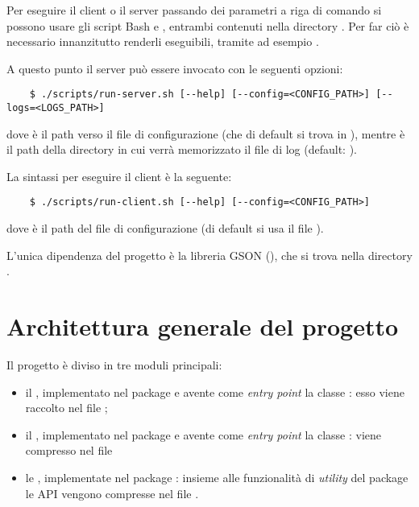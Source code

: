 \documentclass[
    oneside,
    10pt,
    language=italian,
    a4paper,
    article
]{notes}
\begin{document}
Per eseguire il client o il server passando dei parametri a riga di comando si
possono usare gli script Bash  e ,
entrambi contenuti nella directory . Per far ciò è necessario
innanzitutto renderli eseguibili, tramite ad esempio 
.

A questo punto il server può essere invocato con le seguenti opzioni:

\begin{verbatim}
    $ ./scripts/run-server.sh [--help] [--config=<CONFIG_PATH>] [--logs=<LOGS_PATH>]
\end{verbatim}

dove  è il path verso il file di configurazione
(che di default si trova in ), mentre
 è il path della directory in cui verrà memorizzato il file di
log (default: ). 

La sintassi per eseguire il client è la seguente: 

\begin{verbatim}
    $ ./scripts/run-client.sh [--help] [--config=<CONFIG_PATH>]
\end{verbatim}

dove  è il path del file di configurazione (di default
si usa il file ).

L'unica dipendenza del progetto è la libreria GSON (),
che si trova nella directory .

\section{Architettura generale del progetto} \label{sec:arch}
Il progetto è diviso in tre moduli principali: \begin{itemize}
    \item il , implementato nel package 
        e avente come \emph{entry point} la classe 
        : esso viene raccolto
        nel file ;
    \item il , implementato nel package 
        e avente come \emph{entry point} la classe
        : viene compresso nel
        file 
    \item le , implementate nel package :
        insieme alle funzionalità di \emph{utility} del package 
         le API vengono compresse nel file
        .
\end{itemize}
\end{document}

